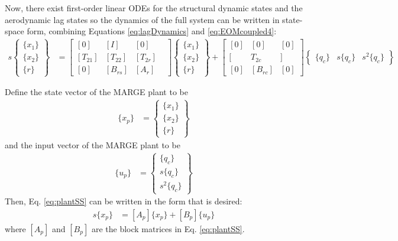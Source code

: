 Now, there exist first-order linear ODEs for the structural dynamic states and the aerodynamic lag states so the dynamics of the full system can be written in state-space form, combining Equations \ref{eq:lagDynamics} and \ref{eq:EOMcoupled4}:
\begin{align}
	\label{eq:plantSS}
	s \begin{Bmatrix} \{x_1\} \\ \{x_2\} \\ \{r\} \end{Bmatrix}
	&= \begin{bmatrix}
		[0] & [I] & [0] & \\
		[T_{21}] & [T_{22}] & [T_{2r}] \\
		[0] & [B_{rs}] & [A_r]
	\end{bmatrix}
	\begin{Bmatrix} \{x_1\} \\ \{x_2\} \\ \{r\} \end{Bmatrix}
	+ \begin{bmatrix}
		[0] & [0] & [0] \\
		[ & T_{2c} & ] \\
		[0] & [B_{rc}] & [0]
	\end{bmatrix}
	\begin{Bmatrix} \{q_c\} & s \{q_c\} & s^2 \{q_c\} \end{Bmatrix}
\end{align}

Define the state vector of the MARGE plant to be
\begin{align}
	\label{eq:plantState}
	\{x_p\} &= \begin{Bmatrix} \{x_1\} \\ \{x_2\} \\ \{r\} \end{Bmatrix}
\end{align}
and the input vector of the MARGE plant to be
\begin{align}
	\{u_p\} &= \begin{Bmatrix} \{q_c\} \\ s \{q_c\} \\ s^2 \{q_c\} \end{Bmatrix}
\end{align}
Then, Eq. \ref{eq:plantSS} can be written in the form that is desired:
\begin{align}
	s \{x_p\} &= [A_p] \{x_p\} + [B_p] \{u_p\}
\end{align}
where $[A_p]$ and $[B_p]$ are the block matrices in Eq. \ref{eq:plantSS}.

